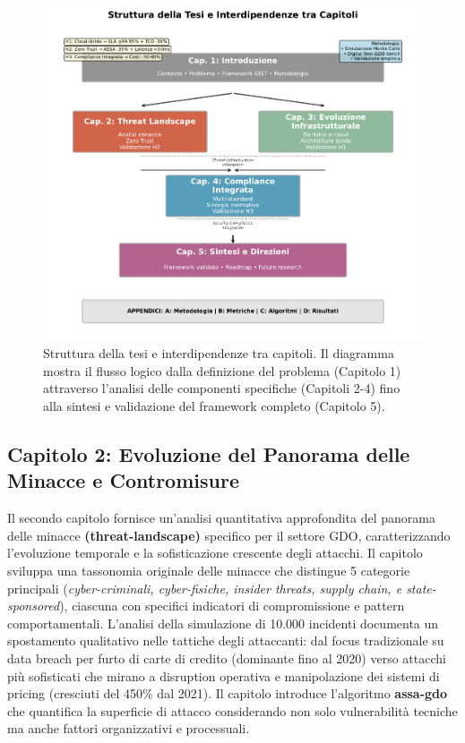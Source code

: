 \begin{figure}[H]
\centering
\includegraphics[width=1\textwidth]{thesis_figures/cap1/fig_1_4_thesis_structure.pdf}
\caption{Struttura della tesi e interdipendenze tra capitoli. Il diagramma mostra il flusso logico dalla definizione del problema (Capitolo 1) attraverso l'analisi delle componenti specifiche (Capitoli 2-4) fino alla sintesi e validazione del framework completo (Capitolo 5).}
\label{fig:thesis_structure}
\end{figure}

\subsection{\texorpdfstring{\textbf{Capitolo 2: Evoluzione del Panorama delle Minacce e Contromisure}}{1.6.1 - Capitolo 2: Evoluzione del Panorama delle Minacce e Contromisure}}

\label{ssec:struttura_cap2}
Il secondo capitolo fornisce un'analisi quantitativa approfondita del panorama delle minacce \textbf{(\gls{threat-landscape})} specifico per il settore GDO, caratterizzando l'evoluzione temporale e la sofisticazione crescente degli attacchi. Il capitolo sviluppa una tassonomia originale delle minacce che distingue 5 categorie principali (\emph{cyber-criminali, cyber-fisiche, insider threats, supply chain, e state-sponsored}), ciascuna con specifici indicatori di compromissione e pattern comportamentali. L'analisi della simulazione di 10.000 incidenti documenta un spostamento qualitativo nelle tattiche degli attaccanti: dal focus tradizionale su data breach per furto di carte di credito (dominante fino al 2020) verso attacchi più sofisticati che mirano a disruption operativa e manipolazione dei sistemi di pricing (cresciuti del 450\% dal 2021).
Il capitolo introduce l'algoritmo \textbf{\gls{assa-gdo}} che quantifica la superficie di attacco considerando non solo vulnerabilità tecniche ma anche fattori organizzativi e processuali.

